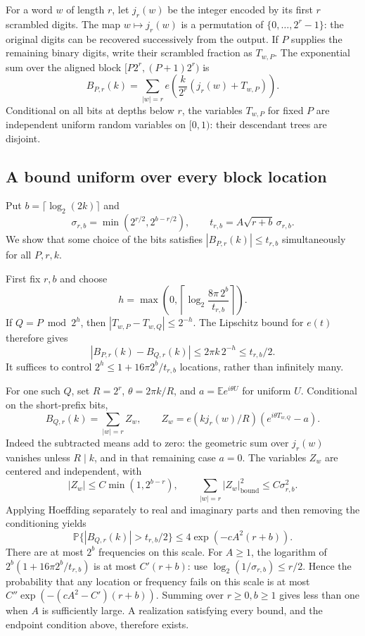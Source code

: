For a word $w$ of length $r$, let $j_r(w)$ be the integer encoded by its first $r$ scrambled digits. The map $w\mapsto j_r(w)$ is a permutation of $\{0,\ldots,2^r-1\}$: the original digits can be recovered successively from the output. If $P$ supplies the remaining binary digits, write their scrambled fraction as $T_{w,P}$. The exponential sum over the aligned block $[P2^r,(P+1)2^r)$ is
\[
 B_{P,r}(k)=\sum_{|w|=r}e\left(\frac{k}{2^r}(j_r(w)+T_{w,P})\right).
\]
Conditional on all bits at depths below $r$, the variables $T_{w,P}$ for fixed $P$ are independent uniform random variables on $[0,1)$: their descendant trees are disjoint.

\subsection*{A bound uniform over every block location}
Put $b=\lceil\log_2(2k)\rceil$ and
\[
 \sigma_{r,b}=\min(2^{r/2},2^{b-r/2}),\qquad
 t_{r,b}=A\sqrt{r+b}\,\sigma_{r,b}.
\]
We show that some choice of the bits satisfies $|B_{P,r}(k)|\le t_{r,b}$ simultaneously for all $P,r,k$.

First fix $r,b$ and choose
\[
 h=\max\left(0,\left\lceil\log_2\frac{8\pi\,2^b}{t_{r,b}}\right\rceil\right).
\]
If $Q=P\bmod 2^h$, then $|T_{w,P}-T_{w,Q}|\le2^{-h}$. The Lipschitz bound for $e(t)$ therefore gives
\[
 |B_{P,r}(k)-B_{Q,r}(k)|\le2\pi k\,2^{-h}\le t_{r,b}/2.
\]
It suffices to control $2^h\le1+16\pi2^b/t_{r,b}$ locations, rather than infinitely many.

For one such $Q$, set $R=2^r$, $\theta=2\pi k/R$, and $a=\mathbb E e^{i\theta U}$ for uniform $U$. Conditional on the short-prefix bits,
\[
 B_{Q,r}(k)=\sum_{|w|=r} Z_w,\qquad
 Z_w=e(kj_r(w)/R)(e^{i\theta T_{w,Q}}-a).
\]
Indeed the subtracted means add to zero: the geometric sum over $j_r(w)$ vanishes unless $R\mid k$, and in that remaining case $a=0$. The variables $Z_w$ are centered and independent, with
\[
 |Z_w|\le C\min(1,2^{b-r}),\qquad
 \sum_{|w|=r}|Z_w|_{\mathrm{bound}}^2\le C\sigma_{r,b}^2.
\]
Applying Hoeffding separately to real and imaginary parts and then removing the conditioning yields
\[
 \mathbb P\{|B_{Q,r}(k)|>t_{r,b}/2\}
 \le4\exp(-cA^2(r+b)).
\]
There are at most $2^b$ frequencies on this scale. For $A\ge1$, the logarithm of
$2^b(1+16\pi2^b/t_{r,b})$ is at most $C'(r+b)$: use
$\log_2(1/\sigma_{r,b})\le r/2$. Hence the probability that any location or frequency fails on this scale is at most
$C''\exp(-(cA^2-C')(r+b))$. Summing over $r\ge0,b\ge1$ gives less than one when $A$ is sufficiently large. A realization satisfying every bound, and the endpoint condition above, therefore exists.

